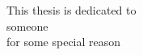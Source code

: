 \begin{dedication}

  This thesis is dedicated to\\

  someone\\

  for some special reason\\

\end{dedication}
